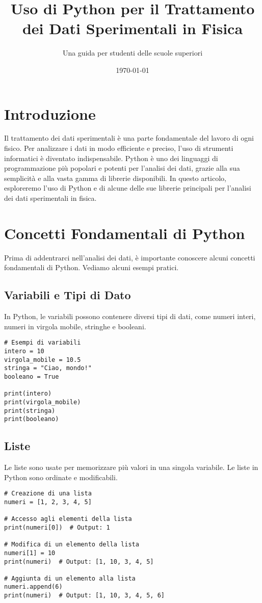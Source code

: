 \documentclass[12pt]{article}
\title{Uso di Python per il Trattamento dei Dati Sperimentali in Fisica}
\author{Una guida per studenti delle scuole superiori}
\date{\today}
\begin{document}
\maketitle

\tableofcontents

\newpage

\section{Introduzione}
Il trattamento dei dati sperimentali è una parte fondamentale del lavoro di ogni fisico. Per analizzare i dati in modo efficiente e preciso, l'uso di strumenti informatici è diventato indispensabile. Python è uno dei linguaggi di programmazione più popolari e potenti per l'analisi dei dati, grazie alla sua semplicità e alla vasta gamma di librerie disponibili. In questo articolo, esploreremo l'uso di Python e di alcune delle sue librerie principali per l'analisi dei dati sperimentali in fisica.

\section{Concetti Fondamentali di Python}
Prima di addentrarci nell'analisi dei dati, è importante conoscere alcuni concetti fondamentali di Python. Vediamo alcuni esempi pratici.

\subsection{Variabili e Tipi di Dato}
In Python, le variabili possono contenere diversi tipi di dati, come numeri interi, numeri in virgola mobile, stringhe e booleani.

\begin{verbatim}
# Esempi di variabili
intero = 10
virgola_mobile = 10.5
stringa = "Ciao, mondo!"
booleano = True

print(intero)
print(virgola_mobile)
print(stringa)
print(booleano)
\end{verbatim}

\subsection{Liste}
Le liste sono usate per memorizzare più valori in una singola variabile. Le liste in Python sono ordinate e modificabili.

\begin{verbatim}
# Creazione di una lista
numeri = [1, 2, 3, 4, 5]

# Accesso agli elementi della lista
print(numeri[0])  # Output: 1

# Modifica di un elemento della lista
numeri[1] = 10
print(numeri)  # Output: [1, 10, 3, 4, 5]

# Aggiunta di un elemento alla lista
numeri.append(6)
print(numeri)  # Output: [1, 10, 3, 4, 5, 6]
\end{verbatim}
\end{document}
